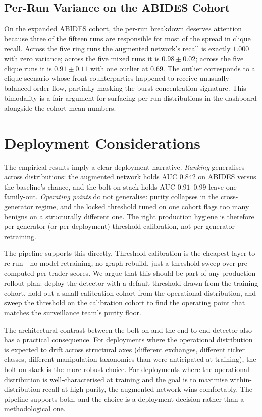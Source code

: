 \documentclass[10pt,twocolumn,letterpaper]{article}
\begin{document}
\subsection{Per-Run Variance on the ABIDES Cohort}
\label{sec:abides-var}
On the expanded ABIDES cohort, the per-run breakdown deserves
attention because three of the fifteen runs are responsible for most
of the spread in clique recall. Across the five ring runs the
augmented network's recall is exactly \(1.000\) with zero variance;
across the five mixed runs it is \(0.98\pm0.02\); across the five
clique runs it is \(0.91\pm0.11\) with one outlier at \(0.69\). The
outlier corresponds to a clique scenario whose front counterparties
happened to receive unusually balanced order flow, partially masking
the burst-concentration signature. This bimodality is a fair argument
for surfacing per-run distributions in the dashboard alongside the
cohort-mean numbers.

\section{Deployment Considerations}
\label{sec:deploy}

The empirical results imply a clear deployment narrative.
\emph{Ranking} generalises across distributions: the augmented network
holds AUC \(0.842\) on ABIDES versus the baseline's chance, and the
bolt-on stack holds AUC \(0.91\)--\(0.99\) leave-one-family-out.
\emph{Operating points} do not generalise: purity collapses in the
cross-generator regime, and the locked threshold tuned on one cohort
flags too many benigns on a structurally different one. The right
production hygiene is therefore per-generator (or per-deployment)
threshold calibration, not per-generator retraining.

The pipeline supports this directly. Threshold calibration is the
cheapest layer to re-run---no model retraining, no graph rebuild, just
a threshold sweep over pre-computed per-trader scores. We argue that
this should be part of any production rollout plan: deploy the
detector with a default threshold drawn from the training cohort, hold
out a small calibration cohort from the operational distribution, and
sweep the threshold on the calibration cohort to find the operating
point that matches the surveillance team's purity floor.

The architectural contrast between the bolt-on and the end-to-end
detector also has a practical consequence. For deployments where the
operational distribution is expected to drift across structural axes
(different exchanges, different ticker classes, different
manipulation taxonomies than were anticipated at training), the
bolt-on stack is the more robust choice. For deployments where the
operational distribution is well-characterised at training and the
goal is to maximise within-distribution recall at high purity, the
augmented network wins comfortably. The pipeline supports both, and
the choice is a deployment decision rather than a methodological one.
\end{document}
